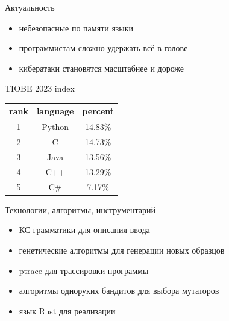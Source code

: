 \documentclass[hyperref={unicode=true}, 12pt]{beamer}
\begin{document}
	\begin{frame}{Актуальность}
		\begin{minipage}{0.53\textwidth}
			\raggedright
			\begin{itemize}
				
				\fontsize{12}{15}
				
				\item небезопасные по памяти языки
				
				\item программистам сложно удержать всё в голове
				
				\item кибератаки становятся масштабнее и дороже
			\end{itemize}
		
		\end{minipage}\begin{minipage}{0.47\textwidth}
			\centering
			TIOBE 2023 index
			
			\vspace{0.1cm}
			\begin{tabular}{|c|c|c|}
				\hline
				rank & language & percent \\
				\hline
				1 & Python & 14.83\% \\
				\hline
				2 & C & 14.73\% \\
				\hline
				3 & Java & 13.56\% \\
				\hline
				4 & C++ & 13.29\% \\
				\hline
				5 & C\# & 7.17\% \\
				\hline
			\end{tabular}
		\end{minipage}
		
	\end{frame}

	\begin{frame}[t]{Технологии, алгоритмы, инструментарий}
			\vspace{1cm}
		\begin{itemize}
			\fontsize{14}{18}
			\selectfont
			\item КС грамматики для описания ввода %
			\item генетические алгоритмы для генерации новых образцов
			\item ptrace для трассировки программы
			\item алгоритмы одноруких бандитов для выбора мутаторов
			\item язык Rust для реализации
		\end{itemize}
		
	\end{frame}
\end{document}
